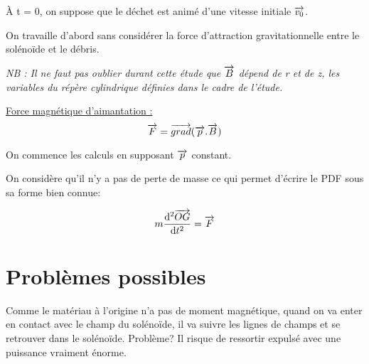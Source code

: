\documentclass{report}
\begin{document}

À t = 0, on suppose que le déchet est animé d'une vitesse initiale $\overrightarrow{v_0}$.


On travaille d'abord sans considérer la force d'attraction gravitationnelle entre le solénoïde et le débris.


\emph{NB : Il ne faut pas oublier durant cette étude que $\overrightarrow{B}$ dépend de r et de z, les variables du répère cylindrique définies dans le cadre de l'étude.}

\underline{Force magnétique d'aimantation :} 
$$\overrightarrow{F} = \overrightarrow{grad}(\overrightarrow{p}.\overrightarrow{B})$$

On commence les calculs en supposant $\overrightarrow{p}$ constant.


On considère qu'il n'y a pas de perte de masse ce qui permet d'écrire le PDF sous sa forme bien connue:

$$m\frac{\mathrm{d^2}\overrightarrow{OG}}{\mathrm{d}t^2} = \overrightarrow{F}$$


\section{Problèmes possibles}
Comme le matériau à l'origine n'a pas de moment magnétique, quand on va enter en contact avec le champ du solénoïde, il va suivre les lignes de champs et se retrouver dans le solénoïde. Problème? Il risque de ressortir expulsé avec une puissance vraiment énorme.
\end{document}

